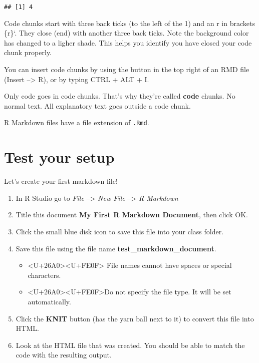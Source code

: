 \documentclass[]{article}
\providecommand{\tightlist}{%
  \setlength{\itemsep}{0pt}\setlength{\parskip}{0pt}}
\begin{document}
\begin{verbatim}
## [1] 4
\end{verbatim}

Code chunks start with three back ticks (to the left of the 1) and an r
in brackets \texttt{}\{r\}`. They close (end) with another three back
ticks. Note the background color has changed to a ligher shade. This
helps you identify you have closed your code chunk properly.

You can insert code chunks by using the button in the top right of an
RMD file (Insert --\textgreater{} R), or by typing CTRL + ALT + I.

Only code goes in code chunks. That's why they're called \textbf{code}
chunks. No normal text. All explanatory text goes outside a code chunk.

R Markdown files have a file extension of \texttt{.Rmd}.

\hypertarget{test-your-setup}{%
\section{Test your setup}\label{test-your-setup}}

Let's create your first markdown file!

\begin{enumerate}
\def\labelenumi{\arabic{enumi}.}
\tightlist
\item
  In R Studio go to \emph{File} --\textgreater{} \emph{New File}
  --\textgreater{} \emph{R Markdown}
\item
  Title this document \textbf{My First R Markdown Document}, then click
  OK.
\item
  Click the small blue disk icon to save this file into your class
  folder.
\item
  Save this file using the file name \textbf{test\_markdown\_document}.

  \begin{itemize}
  \tightlist
  \item
    \textless{}U+26A0\textgreater{}\textless{}U+FE0F\textgreater{} File
    names cannot have spaces or special characters.
  \item
    \textless{}U+26A0\textgreater{}\textless{}U+FE0F\textgreater{}Do not
    specify the file type. It will be set automatically.
  \end{itemize}
\item
  Click the \textbf{KNIT} button (has the yarn ball next to it) to
  convert this file into HTML.
\item
  Look at the HTML file that was created. You should be able to match
  the code with the resulting output.
\end{enumerate}
\end{document}
